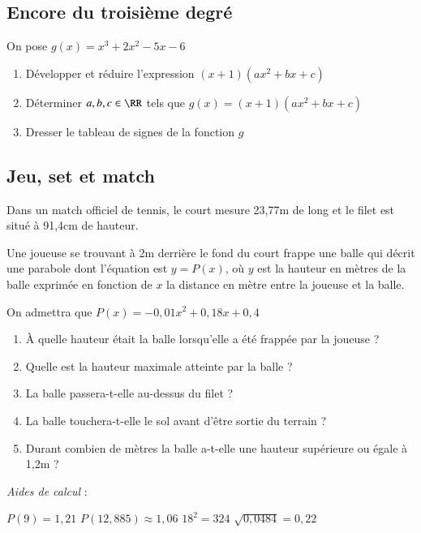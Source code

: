 \documentclass[oneside,12pt]{article}          %
\begin{document}
\subsection{Encore du troisième degré}
On pose $g(x) = x^{3}+2x^{2}-5x-6 $
\begin{enumerate}
    \item Développer et réduire l'expression $(x+1)(ax^{2}+bx+c) $ 
    \item Déterminer $a,b,c\in\RR$ tels que $g(x) = (x+1)(ax^{2}+bx+c) $ 
    \item Dresser le tableau de signes de la fonction $g$
\end{enumerate}



\subsection{Jeu, set et match}
Dans un match officiel de tennis, le court mesure 23,77m de long et le filet est situé à 91,4cm de hauteur.

Une joueuse se trouvant à 2m derrière le fond du court frappe une balle qui décrit une parabole dont l'équation est $y=P(x)$, où $y$ est la hauteur en mètres de la balle exprimée en fonction de $x$ la distance en mètre entre la joueuse et la balle.

On admettra que $P(x)=-0,01x^2+0,18x+0,4$
\begin{enumerate}
	\item À quelle hauteur était la balle lorsqu'elle a été frappée par la joueuse ?
	\item Quelle est la hauteur maximale atteinte par la balle ?
	\item La balle passera-t-elle au-dessus du filet ?
	\item La balle touchera-t-elle le sol avant d'être sortie du terrain ?
	\item Durant combien de mètres la balle a-t-elle une hauteur supérieure ou égale à 1,2m ?
\end{enumerate}

\textit{Aides de calcul} :

\phantom{} \qquad $P(9)=1,21$ \quad $P(12,885)\approx 1,06$ \quad $18^2=324$ \quad $\sqrt{0,0484}=0,22$
\end{document}
